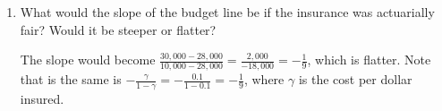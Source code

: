 \documentclass[12pt]{article}
\newcounter{question}[section]
\newenvironment{subquestions}{
  \begin{enumerate}[label=(\roman*)]}{\end{enumerate}}
\begin{document}
\begin{subquestions}
    \textcolor{solution-color}{
      The actuarially fair insurance policy should cost $10\cent$ per dollar
      lost. To fully insure it would cost \$2,000 if it was actuarially fair.
    }

  \item What would the slope of the budget line be if the insurance was
    actuarially fair? Would it be steeper or flatter?

    \textcolor{solution-color}{
      The slope would become
      $\frac{30,000-28,000}{10,000-28,000}=\frac{2,000}{-18,000}=-\frac{1}{9}$,
      which is flatter.  Note that is the same is
      $-\frac{\gamma}{1-\gamma}=-\frac{0.1}{1-0.1}=-\frac{1}{9}$, where
      $\gamma$ is the cost per dollar insured.
    }

\end{subquestions}
\end{document}
